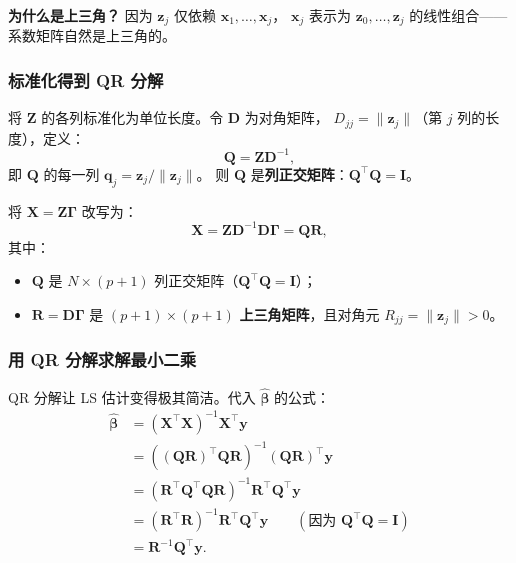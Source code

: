 \textbf{为什么是上三角？} 因为 $\mathbf{z}_j$ 仅依赖 $\mathbf{x}_1, \dots, \mathbf{x}_j$，
$\mathbf{x}_j$ 表示为 $\mathbf{z}_0, \dots, \mathbf{z}_j$ 的线性组合——系数矩阵自然是上三角的。

\subsubsection{标准化得到 QR 分解}

将 $\mathbf{Z}$ 的各列标准化为单位长度。令 $\mathbf{D}$ 为对角矩阵，
$D_{jj} = \|\mathbf{z}_j\|$（第 $j$ 列的长度），定义：
\[
    \mathbf{Q} = \mathbf{Z} \mathbf{D}^{-1},
\]
即 $\mathbf{Q}$ 的每一列 $\mathbf{q}_j = \mathbf{z}_j / \|\mathbf{z}_j\|$。
则 $\mathbf{Q}$ 是\textbf{列正交矩阵}：$\mathbf{Q}^\top \mathbf{Q} = \mathbf{I}$。

\begin{definition}[QR 分解]
将 $\mathbf{X} = \mathbf{Z}\bm{\Gamma}$ 改写为：
\begin{equation}\label{eq:QR}
    \boxed{\mathbf{X} = \mathbf{Z} \mathbf{D}^{-1} \mathbf{D} \bm{\Gamma}
    = \mathbf{Q} \mathbf{R}},
\end{equation}
其中：
\begin{itemize}
    \item $\mathbf{Q}$ 是 $N \times (p+1)$ 列正交矩阵（$\mathbf{Q}^\top \mathbf{Q} = \mathbf{I}$）；
    \item $\mathbf{R} = \mathbf{D}\bm{\Gamma}$ 是 $(p+1) \times (p+1)$ \textbf{上三角矩阵}，且对角元 $R_{jj} = \|\mathbf{z}_j\| > 0$。
\end{itemize}
\end{definition}

\subsubsection{用 QR 分解求解最小二乘}

QR 分解让 LS 估计变得极其简洁。代入 $\hat{\bm{\beta}}$ 的公式：
\begin{align}
    \hat{\bm{\beta}}
    &= (\mathbf{X}^\top \mathbf{X})^{-1} \mathbf{X}^\top \mathbf{y} \nonumber\\
    &= ((\mathbf{Q}\mathbf{R})^\top \mathbf{Q}\mathbf{R})^{-1} (\mathbf{Q}\mathbf{R})^\top \mathbf{y} \nonumber\\
    &= (\mathbf{R}^\top \mathbf{Q}^\top \mathbf{Q} \mathbf{R})^{-1} \mathbf{R}^\top \mathbf{Q}^\top \mathbf{y} \nonumber\\
    &= (\mathbf{R}^\top \mathbf{R})^{-1} \mathbf{R}^\top \mathbf{Q}^\top \mathbf{y}
       \qquad (\text{因为 } \mathbf{Q}^\top \mathbf{Q} = \mathbf{I}) \nonumber\\
    &= \mathbf{R}^{-1} \mathbf{Q}^\top \mathbf{y}. \label{eq:QR_beta}
\end{align}

